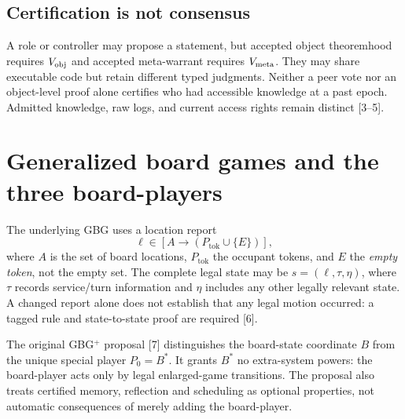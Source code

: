 \documentclass[10pt,letterpaper]{article}
\theoremstyle{remark}\newtheorem{remark}[definition]{Remark}
\begin{document}
\subsection{Certification is not consensus}
A role or controller may propose a statement, but accepted object theoremhood requires $V_{\rm obj}$ and accepted meta-warrant requires $V_{\rm meta}$. They may share executable code but retain different typed judgments. Neither a peer vote nor an object-level proof alone certifies who had accessible knowledge at a past epoch. Admitted knowledge, raw logs, and current access rights remain distinct [3--5].

\section{Generalized board games and the three board-players}
The underlying GBG uses a location report
\[
\ell\in[A\to(P_{\mathrm{tok}}\cup\{E\})],
\]
where $A$ is the set of board locations, $P_{\mathrm{tok}}$ the occupant tokens, and $E$ the \emph{empty token}, not the empty set. The complete legal state may be $s=(\ell,\tau,\eta)$, where $\tau$ records service/turn information and $\eta$ includes any other legally relevant state. A changed report alone does not establish that any legal motion occurred: a tagged rule and state-to-state proof are required [6].

The original GBG$^+$ proposal [7] distinguishes the board-state coordinate $B$ from the unique special player $P_0=B^*$. It grants $B^*$ no extra-system powers: the board-player acts only by legal enlarged-game transitions. The proposal also treats certified memory, reflection and scheduling as optional properties, not automatic consequences of merely adding the board-player.
\end{document}
